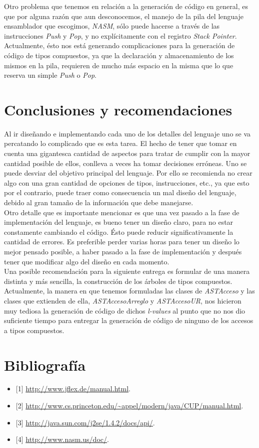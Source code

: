 \documentclass[11pt, spanish]{report}
\begin{document}
Otro problema que tenemos en relaci\'on a la generaci\'on de c\'odigo en general, es que por alguna raz\'on que aun desconocemos, el manejo de la pila
del lenguaje ensamblador que escogimos, \emph{NASM}, s\'olo puede hacerse a trav\'es de las instrucciones \emph{Push} y \emph{Pop}, y no expl\'icitamente
con el registro \emph{Stack Pointer}. \\

\newpage
Actualmente, \'esto nos est\'a generando complicaciones para la generaci\'on de c\'odigo de tipos compuestos, ya que la declaraci\'on y almacenamiento 
de los mismos en la pila, requieren de mucho m\'as espacio en la misma que lo que reserva un simple \emph{Push} o \emph{Pop}.\\

\chapter{Conclusiones y recomendaciones}
Al ir dise\~nando e implementando cada uno de los detalles del lenguaje uno se va percatando lo complicado que es esta tarea. El hecho de tener que 
tomar en cuenta una gigantesca cantidad de aspectos para tratar de cumplir con la mayor cantidad posible de ellos, conlleva a veces ha  tomar decisiones err\'oneas. 
Uno se  puede desviar del objetivo principal del lenguaje. Por ello se recomienda no crear algo con una gran cantidad de opciones de tipos, instrucciones, etc., ya 
que esto por el contrario, puede traer como consecuencia un mal dise\~no del lenguaje, debido al gran tama\~no de la informaci\'on que debe manejarse.\\

Otro detalle que es importante mencionar es que una vez pasado a la fase de implementaci\'on del lenguaje, es bueno tener un dise\~no claro, para no estar constamente 
cambiando el c\'odigo. \'Esto puede reducir significativamente la cantidad de errores. Es preferible perder varias horas para tener un dise\~no lo mejor pensado posible, 
a haber pasado a la fase de implementaci\'on y despu\'es tener que modificar algo del dise\~no en cada momento.\\

Una posible recomendaci\'on para la siguiente entrega es formular de una manera distinta y m\'as sencilla, la construcci\'on de los \'arboles de tipos compuestos.
Actualmente, la manera en que tenemos formuladas las clases de \emph{ASTAcceso} y las clases que extienden de ella, \emph{ASTAccesoArreglo} y \emph{ASTAccesoUR}, 
nos hicieron muy tediosa la generaci\'on de c\'odigo de dichos \emph{l-values} al punto que no nos dio suficiente tiempo para entregar la generaci\'on de c\'odigo
de ninguno de los accesos a tipos compuestos.\\

\chapter{Bibliograf\'ia}
\begin{itemize}
\item{[1]} \url{http://www.jflex.de/manual.html}.

\item{[2]} \url{http://www.cs.princeton.edu/~appel/modern/java/CUP/manual.html}.

\item{[3]} \url{http://java.sun.com/j2se/1.4.2/docs/api/}.

\item{[4]} \url{http://www.nasm.us/doc/}.
\end{itemize}
\end{document}
